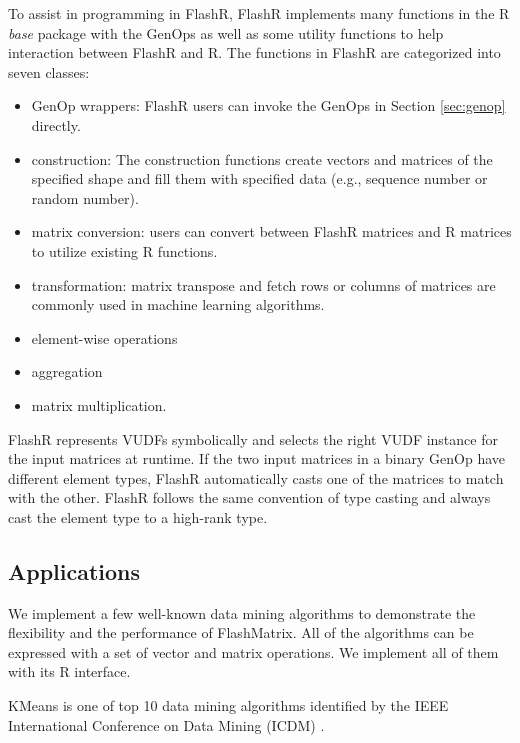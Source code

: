 To assist in programming in FlashR, FlashR implements many functions in
the R \textit{base} package with the GenOps as well as some utility functions
to help interaction between FlashR and R. The functions in FlashR are categorized
into seven classes:
\begin{itemize}
	\item GenOp wrappers: FlashR users can invoke the GenOps in Section
		\ref{sec:genop} directly.
	\item construction: The construction functions create vectors and matrices
		of the specified shape and fill them with specified data (e.g.,
		sequence number or random number).
	\item matrix conversion: users can convert between FlashR matrices and
		R matrices to utilize existing R functions.
	\item transformation: matrix transpose and fetch rows or columns of matrices
		are commonly used in machine learning algorithms.
	\item element-wise operations
	\item aggregation
	\item matrix multiplication.
\end{itemize}


FlashR represents VUDFs symbolically and selects the right VUDF instance for
the input matrices at runtime. If the two input matrices in a binary GenOp have
different element types, FlashR automatically casts one of the matrices to
match with the other. FlashR follows the same convention of type casting and
always cast the element type to a high-rank type.

\subsection{Applications}

We implement a few well-known data mining algorithms to demonstrate
the flexibility and the performance of FlashMatrix. All of the algorithms
can be expressed with a set of vector and matrix operations. We implement
all of them with its R interface.

KMeans is one of top 10 data mining algorithms identified by the IEEE
International Conference on Data Mining (ICDM) \cite{top10}.


